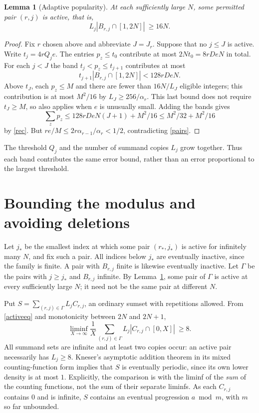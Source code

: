 \documentclass[11pt]{article}
\newtheorem{lemma}[theorem]{Lemma}
\begin{document}
\begin{lemma}[Adaptive popularity]\label{active}
At each sufficiently large $N$, some permitted pair $(r,j)$ is \emph{active}, that is,
\begin{equation}\label{activeeq}
 L_j |B_{r,j}\cap[1,2N]|\ \ge 16N .
\end{equation}
\end{lemma}
\begin{proof}
Fix $r$ chosen above and abbreviate $J=J_r$. Suppose that no $j\le J$ is active. Write $t_j=4rQ_je$. The entries $p_z\le t_0$ contribute at most $2Nt_0=8rDeN$ in total. For each $j<J$ the band $t_j<p_z\le t_{j+1}$ contributes at most
\[
 t_{j+1}|B_{r,j}\cap[1,2N]|<128rDeN.
\]
Above $t_J$, each $p_z\le M$ and there are fewer than $16N/L_J$ eligible integers; this contribution is at most $M^2/16$ by $L_J\ge256/\alpha_r$. This last bound does not require $t_J\ge M$, so also applies when $e$ is unusually small. Adding the bands gives
\[
 \sum_z p_z\le128rDeN(J+1)+M^2/16
 \le M^2/32+M^2/16
\]
by \eqref{rec}. But $re/M\le 2r\alpha_{r-1}/\alpha_r<1/2$, contradicting \eqref{pairs}.
\end{proof}
The threshold $Q_j$ and the number of summand copies $L_j$ grow together. Thus each band contributes the same error bound, rather than an error proportional to the largest threshold.

\section{Bounding the modulus and avoiding deletions}
Let $j_*$ be the smallest index at which some pair $(r_*,j_*)$ is active for infinitely many $N$, and fix such a pair. All indices below $j_*$ are eventually inactive, since the family is finite. A pair with $B_{r,j}$ finite is likewise eventually inactive. Let $\Gamma$ be the pairs with $j\ge j_*$ and $B_{r,j}$ infinite. By Lemma~\ref{active}, some pair of $\Gamma$ is active at every sufficiently large $N$; it need not be the same pair at different $N$.

Put $S=\sum_{(r,j)\in\Gamma}L_j C_{r,j}$, an ordinary sumset with repetitions allowed. From \eqref{activeeq} and monotonicity between $2N$ and $2N+1$,
\[
 \liminf_{X\to\infty}\frac{1}{X}
    \sum_{(r,j)\in\Gamma} L_j |C_{r,j}\cap[0,X]|\ \ge 8.
\]
All summand sets are infinite and at least two copies occur: an active pair necessarily has $L_j\ge8$. Kneser's asymptotic addition theorem in its mixed counting-function form \cite{Kneser,CYZ} implies that $S$ is eventually periodic, since its own lower density is at most $1$. Explicitly, the comparison is with the liminf of the \emph{sum} of the counting functions, not the sum of their separate liminfs. As each $C_{r,j}$ contains $0$ and is infinite, $S$ contains an eventual progression $a\bmod m$, with $m$ so far unbounded.
\end{document}
